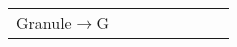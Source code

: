 \begin{longtable}{cXXXXXXX}
Granule\ensuremath{\rightarrow}G &                                                  &                                                                                                                    &                                                           &                                           &                                                                                             &                                           & \\ 

\end{longtable}

